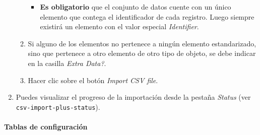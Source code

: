 \documentclass[
]{article}
\providecommand{\tightlist}{%
  \setlength{\itemsep}{0pt}\setlength{\parskip}{0pt}}
\begin{document}
\begin{enumerate}
\begin{enumerate}
    \begin{itemize}
    \tightlist
    \item
      \textbf{Es obligatorio} que el conjunto de datos cuente con un
      único elemento que contega el identificador de cada registro.
      Luego siempre existirá un elemento con el valor especial
      \emph{Identifier}.
    \end{itemize}
  \item
    Si alguno de los elementos no pertenece a ningún elemento
    estandarizado, sino que pertenece a otro elemento de otro tipo de
    objeto, se debe indicar en la casilla \emph{Extra Data?}.
  \item
    Hacer clic sobre el botón \emph{Import CSV file}.
  \end{enumerate}
\item
  Puedes visualizar el progreso de la importación desde la pestaña
  \emph{Status} (ver \texttt{csv-import-plus-status}).
\end{enumerate}

\hypertarget{tablas-de-configuraciuxf3n}{%
\paragraph{Tablas de configuración}\label{tablas-de-configuraciuxf3n}}
\end{document}
